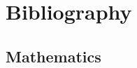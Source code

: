 \section*{Bibliography}
%
\begin{refsection}
    \nocite{*}
    \subsection*{Mathematics}
    \printbibliography[heading=none,title={}, keyword=bib_template]

\end{refsection}